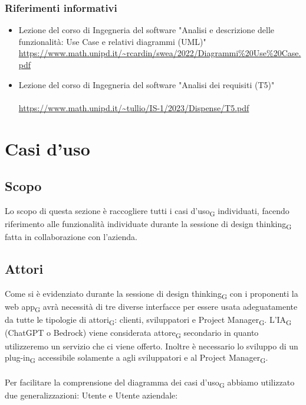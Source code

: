 \documentclass{article}
\begin{document}
\subsubsection{Riferimenti informativi}
\begin{itemize}
    \item Lezione del corso di Ingegneria del software "Analisi e descrizione delle funzionalità: Use Case e relativi diagrammi (UML)" \url{https://www.math.unipd.it/~rcardin/swea/2022/Diagrammi%20Use%20Case.pdf}
    \item Lezione del corso di Ingegneria del software "Analisi dei requisiti (T5)" \\ \\
    \url{https://www.math.unipd.it/~tullio/IS-1/2023/Dispense/T5.pdf}
    
    

\end{itemize}


\section*{Casi d'uso}
\subsection*{Scopo}
Lo scopo di questa sezione è raccogliere tutti i casi d'uso\textsubscript{G} individuati, facendo riferimento alle funzionalità individuate durante la sessione di design thinking\textsubscript{G} fatta in collaborazione con l'azienda.

\subsection*{Attori}
Come si è evidenziato durante la sessione di design thinking\textsubscript{G} con i proponenti la web app\textsubscript{G} avrà necessità di tre diverse interfacce per essere usata adeguatamente da tutte le tipologie di attori\textsubscript{G}: clienti, sviluppatori e Project Manager\textsubscript{G}. L'IA\textsubscript{G}  (ChatGPT o Bedrock) viene considerata attore\textsubscript{G} secondario in quanto utilizzeremo un servizio che ci viene offerto. Inoltre è necessario lo sviluppo di un plug-in\textsubscript{G} accessibile solamente a agli sviluppatori e al Project Manager\textsubscript{G}.\\\\

Per facilitare la comprensione del diagramma dei casi d'uso\textsubscript{G}  abbiamo utilizzato due generalizzazioni: Utente e Utente aziendale: 
\end{document}
